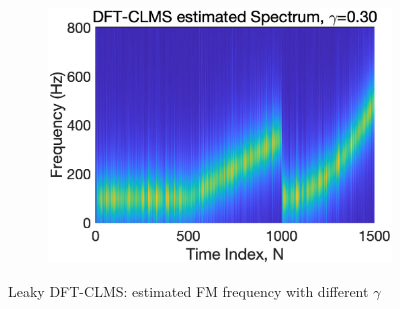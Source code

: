 \begin{figure}[htb]
\begin{subfigure}[b]{0.33\textwidth}
         \centering
         \includegraphics[width=\textwidth]{fig/33/33c4.eps}
     \end{subfigure}
     \hspace{0.4cm}
        \caption{Leaky DFT-CLMS: estimated FM frequency with different $\gamma$}
        \label{fig:3_3_c2}
\end{figure}
